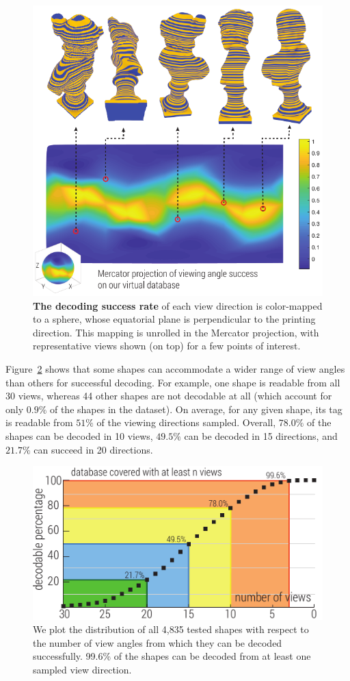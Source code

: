 \documentclass[12pt]{report}
\newcommand{\ft}{4,835 }
\begin{document}
\begin{figure}[t]
    \centering
    \vspace{-4mm}
    \includegraphics[width=0.63\linewidth]{figs/viewingAngleMap.pdf}
    \vspace{-2mm}
    \caption{
    \textbf{The decoding success rate} of each view direction is color-mapped to a sphere, whose equatorial plane is perpendicular to the printing direction. This mapping is unrolled in the Mercator projection, with representative views shown (on top) for a few points of interest.
    \label{fig:decoding_probability}}
    \vspace{-2mm}
\end{figure}


Figure~\ref{fig:viewsPerMeshSorted}
shows that some shapes can accommodate a wider range of view angles than others
for successful decoding.  For example, one shape is readable from all
30 views, whereas 44 other shapes are not decodable at all
(which account for only $0.9\%$ of the shapes in the dataset).  
On average, for any given shape, its tag is readable from $51\%$ of the viewing
directions sampled. Overall, $78.0\%$ of the shapes can be decoded in 10 views, 
$49.5\%$ can be decoded in 15 directions, 
and $21.7\%$ can succeed in 20 directions.

\begin{figure}[h]
    \centering
    \vspace{-2mm}
    \includegraphics[width=0.75\linewidth]{figs/cdfPlot_99.pdf}
    \vspace{-3mm}
    \caption{ 
    We plot the distribution of all \ft tested shapes with respect to the number of view angles from which they can be decoded successfully.
    99.6\% of the shapes can be decoded from at least one sampled view direction.
    \label{fig:viewsPerMeshSorted}}
    \vspace{-7mm}
\end{figure}
\end{document}

